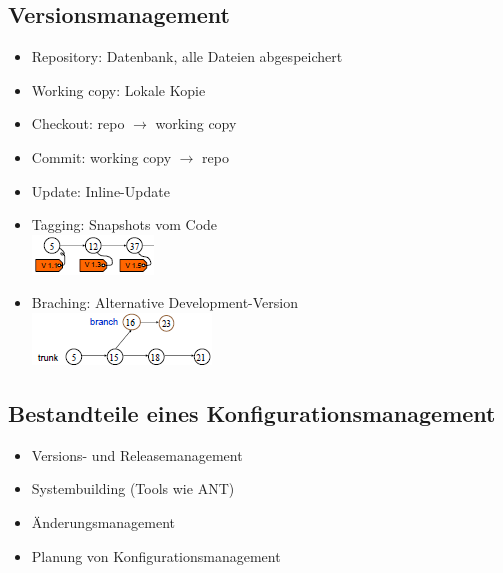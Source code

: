 \documentclass[a4paper,10pt]{article}
\newcommand{\ra}{\rightarrow}
\begin{document}
\subsection{Versionsmanagement}
\begin{itemize}
 \item Repository: Datenbank, alle Dateien abgespeichert
 \item Working copy: Lokale Kopie
 \item Checkout: repo $\ra$ working copy
 \item Commit: working copy $\ra$ repo
 \item Update: Inline-Update
 \item Tagging: Snapshots vom Code\\
\includegraphics{tagging.png}
 \item Braching: Alternative Development-Version\\
\includegraphics{branching.png}
\end{itemize}

\subsection{Bestandteile eines Konfigurationsmanagement}
\begin{itemize}
 \item Versions- und Releasemanagement
 \item Systembuilding (Tools wie ANT)
 \item Änderungsmanagement
 \item Planung von Konfigurationsmanagement
\end{itemize}
\end{document}
